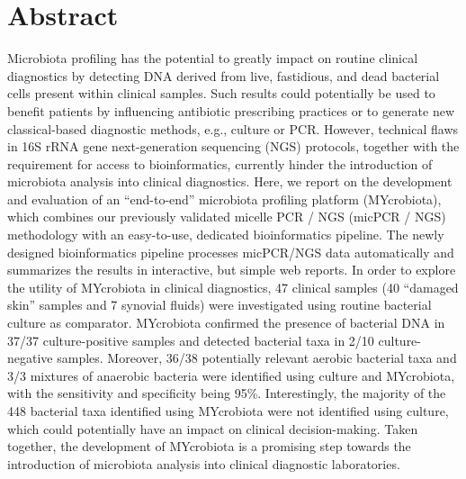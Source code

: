\normalsize

\section*{Abstract}
Microbiota profiling has the potential to greatly impact on routine clinical diagnostics by detecting DNA derived from live,
fastidious, and dead bacterial cells present within clinical samples. Such results could potentially be used to benefit patients
by influencing antibiotic prescribing practices or to generate new classical-based diagnostic methods, e.g., culture or PCR\@.
However, technical flaws in 16S rRNA gene next-generation sequencing (NGS) protocols, together with the requirement for access
to bioinformatics, currently hinder the introduction of microbiota analysis into clinical diagnostics. Here, we report on the
development and evaluation of an “end-to-end” microbiota profiling platform (MYcrobiota), which combines our previously validated
micelle PCR / NGS (micPCR / NGS) methodology with an easy-to-use, dedicated bioinformatics pipeline. The newly designed bioinformatics
pipeline processes micPCR/NGS data automatically and summarizes the results in interactive, but simple web reports. In order to
explore the utility of MYcrobiota in clinical diagnostics, 47 clinical samples (40 “damaged skin” samples and 7 synovial fluids)
were investigated using routine bacterial culture as comparator. MYcrobiota confirmed the presence of bacterial DNA in 37/37
culture-positive samples and detected bacterial taxa in 2/10 culture-negative samples. Moreover, 36/38 potentially relevant
aerobic bacterial taxa and 3/3 mixtures of anaerobic bacteria were identified using culture and MYcrobiota, with the sensitivity
and specificity being 95\%. Interestingly, the majority of the 448 bacterial taxa identified using MYcrobiota were not identified
using culture, which could potentially have an impact on clinical decision-making. Taken together, the development of MYcrobiota
is a promising step towards the introduction of microbiota analysis into clinical diagnostic laboratories.

